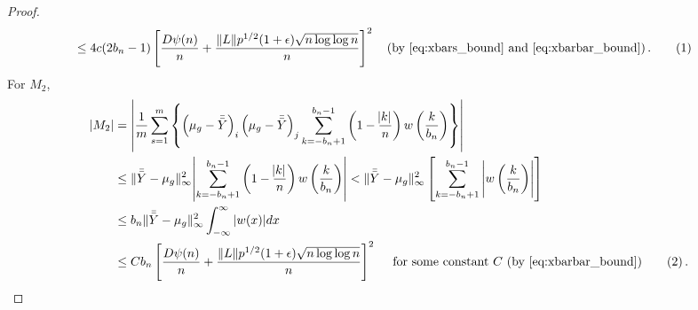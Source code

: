 \documentclass[12pt]{article}
\newcommand\numberthis{\addtocounter{equation}{1}\tag{\theequation}}
\theoremstyle{remark}
\begin{document}
\begin{proof}
\begin{align*}
    & \leq 4c(2b_n - 1)\left[ \dfrac{D \psi(n)}{n} + \dfrac{\|L\| p^{1/2}(1+\epsilon)\sqrt{n \log\log n}}{n}  \right]^2  \quad \text{(by \eqref{eq:xbars_bound} and \eqref{eq:xbarbar_bound})}\,. \numberthis \label{eq:strong_consis_term-1}
\end{align*}
%
%
For $M_2$,
\begin{align*}
   |M_2| & = \left|\dfrac{1}{m}\sum\limits_{s=1}^{m}\left\{ \left(\mu_g - \bar{\bar{Y}} \right)_i  \left(\mu_g - \bar{\bar{Y}} \right)_j\sum_{k=-b_n+1}^{b_n-1}\left(1-\dfrac{\abs{k}}{n}\right)w\left(\dfrac{k}{b_n}\right)\right\}\right|\\
    & \leq\|\bar{\bar{Y}} - \mu_g\|_{\infty}^2\abs{\sum_{k=-b_n+1}^{b_n-1}\left(1-\dfrac{\abs{k}}{n}\right)w\left(\dfrac{k}{b_n}\right)} < \|\bar{\bar{Y}} - \mu_g\|_{\infty}^2\left[\sum_{k=-b_n+1}^{b_n-1}\left|w\left(\dfrac{k}{b_n}\right)\right|\right]\\
    & \leq b_n\|\bar{\bar{Y}} - \mu_g\|_{\infty}^2 \int_{-\infty}^{\infty}|w(x)|dx \\
    & \leq Cb_n\left[ \dfrac{D \psi(n)}{n} + \dfrac{\|L\| p^{1/2}(1+\epsilon)\sqrt{n \log\log n}}{n}  \right]^2 \quad \text{ for some constant $C$ (by \eqref{eq:xbarbar_bound})} \numberthis \label{eq:strong_consis_term-2} \,.
\end{align*}
%
%
%

\end{proof}
\end{document}
